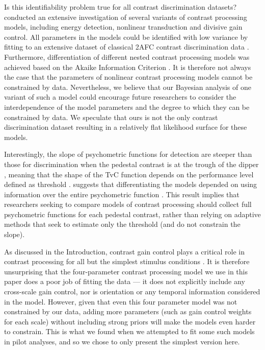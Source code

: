 \documentclass[11pt,a4paper]{article}
\begin{document}
{Is this identifiability problem true for all contrast discrimination datasets?
\citet{Wichmann1999} conducted an extensive investigation of several variants of contrast processing models, including energy detection, nonlinear transduction and divisive gain control.
All parameters in the models could be identified with low variance by fitting to an extensive dataset of classical 2AFC contrast discrimination data \citep[see also][]{Dold2012}.
Furthermore, differentiation of different nested contrast processing models was achieved based on the Akaike Information Criterion \citep[AIC;][]{Akaike1974}.
It is therefore not always the case that the parameters of nonlinear contrast processing models cannot be constrained by data.
Nevertheless, we believe that our Bayesian analysis of one variant of such a model could encourage future researchers to consider the interdependence of the model parameters and the degree to which they can be constrained by data.
We speculate that ours is not the only contrast discrimination dataset resulting in a relatively flat likelihood surface for these models.

Interestingly, the slope of psychometric functions for detection are steeper than those for discrimination when the pedestal contrast is at the trough of the dipper \citep[if performance is plotted against $\Delta \mathrm{c}$,][]{Nachmias1974, Foley1981, Wichmann1999}, meaning that the shape of the TvC function depends on the performance level defined as threshold \citep[see also][]{GarciaPerez2007}.
\citet{Wichmann1999} suggests that differentiating the models depended on using information over the entire psychometric function \citep[see also][]{Green1960}.
This result implies that researchers seeking to compare models of contrast processing should collect full psychometric functions for each pedestal contrast, rather than relying on adaptive methods that seek to estimate only the threshold (and do not constrain the slope).

As discussed in the Introduction, contrast gain control plays a critical role in contrast processing for all but the simplest stimulus conditions \citep{Morrone1982,Heeger1992,Geisler1992,Foley1994, Meese2002, Holmes2004, Meese2007, Bex2007, Bex2009, Haun2010, Haun2013a}.
It is therefore unsurprising that the four-parameter contrast processing model we use in this paper does a poor job of fitting the data --- it does not explicitly include any cross-scale gain control, nor is orientation or any temporal information considered in the model. 
However, given that even this four parameter model was not constrained by our data, adding more parameters (such as gain control weights for each scale) without including strong priors will make the models even harder to constrain. 
This is what we found when we attempted to fit some such models in pilot analyses, and so we chose to only present the simplest version here.

}
\end{document}
